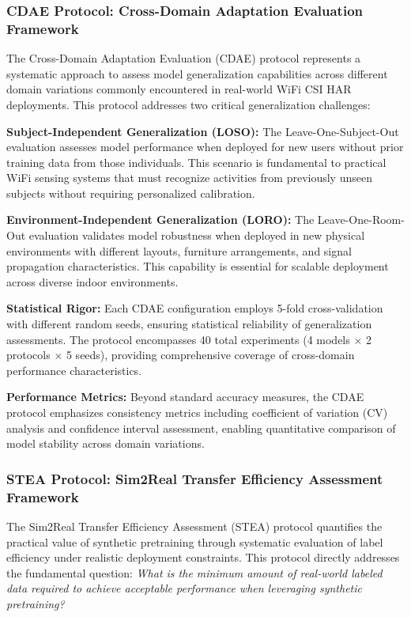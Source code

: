 
\subsubsection{CDAE Protocol: Cross-Domain Adaptation Evaluation Framework}

The Cross-Domain Adaptation Evaluation (CDAE) protocol represents a systematic approach to assess model generalization capabilities across different domain variations commonly encountered in real-world WiFi CSI HAR deployments. This protocol addresses two critical generalization challenges:

\textbf{Subject-Independent Generalization (LOSO):} The Leave-One-Subject-Out evaluation assesses model performance when deployed for new users without prior training data from those individuals. This scenario is fundamental to practical WiFi sensing systems that must recognize activities from previously unseen subjects without requiring personalized calibration.

\textbf{Environment-Independent Generalization (LORO):} The Leave-One-Room-Out evaluation validates model robustness when deployed in new physical environments with different layouts, furniture arrangements, and signal propagation characteristics. This capability is essential for scalable deployment across diverse indoor environments.

\textbf{Statistical Rigor:} Each CDAE configuration employs 5-fold cross-validation with different random seeds, ensuring statistical reliability of generalization assessments. The protocol encompasses 40 total experiments (4 models × 2 protocols × 5 seeds), providing comprehensive coverage of cross-domain performance characteristics.

\textbf{Performance Metrics:} Beyond standard accuracy measures, the CDAE protocol emphasizes consistency metrics including coefficient of variation (CV) analysis and confidence interval assessment, enabling quantitative comparison of model stability across domain variations.

\subsubsection{STEA Protocol: Sim2Real Transfer Efficiency Assessment Framework}

The Sim2Real Transfer Efficiency Assessment (STEA) protocol quantifies the practical value of synthetic pretraining through systematic evaluation of label efficiency under realistic deployment constraints. This protocol directly addresses the fundamental question: \textit{What is the minimum amount of real-world labeled data required to achieve acceptable performance when leveraging synthetic pretraining?}

